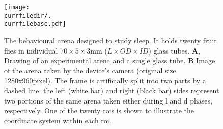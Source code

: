 \begin{figure}[h!]
  \centering   
   \texttt{[image: \\currfiledir/.\\currfilebase.pdf]}
  \caption[Sleep arena]{
  	The behavioural arena designed to study sleep. It holds twenty fruit flies in individual $70 \times{} 5 \times{} 3$mm ($L\times{}OD\times{}ID$) glass tubes.
 	 \textbf{A}, Drawing of an experimental arena and a single glass tube.
 	 \textbf{B} Image of the arena taken by the device's camera (original size 1280x960pixel). 
The frame is artificially split into two parts by a dashed line: the left (white bar) and right (black bar) sides represent two portions of the same arena taken either during \gls{l} and \gls{d} phases, respectively. 
One of the twenty \glspl{roi} is shown to illustrate the coordinate system within each \gls{roi}.
  \label{fig:\currfilebase}
  }
\end{figure}





